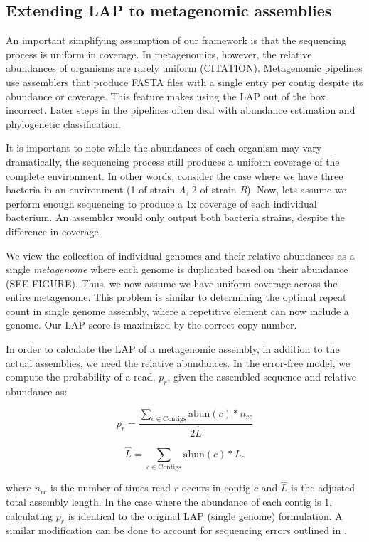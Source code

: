 \documentclass[conference]{IEEEtran}
\begin{document}
\subsection{Extending LAP to metagenomic assemblies}
An important simplifying assumption of our framework is that the sequencing process is uniform in coverage.
In metagenomics, however, the relative abundances of organisms are rarely uniform (CITATION).
Metagenomic pipelines use assemblers that produce FASTA files with a single entry per contig despite its abundance or coverage.
This feature makes using the LAP out of the box incorrect.
Later steps in the pipelines often deal with abundance estimation and phylogenetic classification.

It is important to note while the abundances of each organism may vary dramatically, the sequencing process still produces a uniform coverage of the complete environment.
In other words, consider the case where we have three bacteria in an environment (1 of strain \emph{A}, 2 of strain \emph{B}).
Now, lets assume we perform enough sequencing to produce a 1x coverage of each individual bacterium.
An assembler would only output both bacteria strains, despite the difference in coverage.

We view the collection of individual genomes and their relative abundances as a single \emph{metagenome} where each genome is duplicated based on their abundance (SEE FIGURE).
Thus, we now assume we have uniform coverage across the entire metagenome.
This problem is similar to determining the optimal repeat count in single genome assembly, where a repetitive element can now include a genome.
Our LAP score is maximized by the correct copy number.

In order to calculate the LAP of a metagenomic assembly, in addition to the actual assemblies, we need the relative abundances.
In the error-free model, we compute the probability of a read, $p_r$, given the assembled sequence and relative abundance as:

\begin{equation}
  \label{meta_read_probability}
  p_r = \frac{\sum_{c \in \text{Contigs}}\text{abun}(c)*n_{rc}}{2\hat{L}}
\end{equation}

\begin{equation}
  \label{meta_read_length}
  \hat{L} = \sum_{c \in \text{Contigs}}\text{abun}(c)*L_{c}
\end{equation}

where $n_{rc}$ is the number of times read $r$ occurs in contig $c$ and $\hat{L}$ is the adjusted total assembly length.  In the case where the abundance of each contig is 1, calculating $p_r$ is identical to the original LAP (single genome) formulation.  A similar modification can be done to account for sequencing errors outlined in \cite{LAP}.
\end{document}
